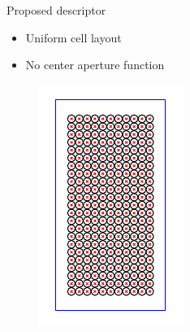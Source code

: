 \documentclass[14pt,t]{beamer}
\begin{document}
\begin{frame}{Proposed descriptor}
\begin{minipage}[t]{0.49\textwidth}
\begin{itemize}
\item Uniform cell layout
\item No center aperture function
\end{itemize}
\end{minipage}
\begin{minipage}[t]{0.49\textwidth}
\begin{figure}
	\includegraphics[height=0.7\textheight, clip=true, trim=9 9 9 9]{img/pedestrianWindowGrid.pdf}
\end{figure}
\end{minipage}
\end{frame}
%
\end{document}
